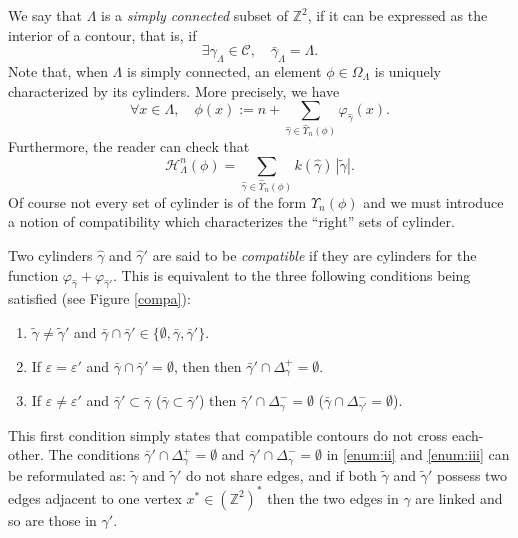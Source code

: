 \documentclass[JEP,XML,SOM,Unicode, NoFloatCountersInSection]{cedram}
\let\mathcal\mathscr
\newenvironment{enumeratei}
{\bgroup\def\theenumi{\roman{enumi}}\def\theenumii{\Alph{enumii}}\begin{enumerate}}
{\end{enumerate}\egroup}
\numberwithin{equation}{section}
\theoremstyle{plain}
\theoremstyle{definition}
\newcommand{\cH}{{\ensuremath{\mathcal H}} }
\newcommand{\cC}{{\ensuremath{\mathcal C}} }
\newcommand{\bbZ}{{\ensuremath{\mathbb Z}} }
\newcommand{\gep}{\varepsilon}
\newcommand{\gO}{\Omega}
\newcommand{\gL}{\Lambda}
\begin{document}
We say that $\gL$ is a \textit{simply connected} subset of $\bbZ^2$, if it can be expressed as the interior of a contour,
that is, if
\begin{equation} \label{connectedness}
\exists \gamma_{\gL}\in \cC, \quad \bar\gamma_{\gL}=\gL.
\end{equation}
Note that, when $\gL$ is simply connected,
an element
$\phi\in \gO_{\gL}$ is uniquely characterized by its cylinders. More precisely, we have
\begin{equation}\label{cylinder}
\forall x\in \gL, \quad \phi(x):= n+\sum_{\hat \gamma \in \hat \Upsilon_n(\phi)} \varphi_{\hat \gamma}(x).
\end{equation}
Furthermore, the reader can check that
\begin{equation}\label{express}
\cH^n_{\gL}(\phi)=\sum_{\hat \gamma \in \hat \Upsilon_n(\phi)} k(\hat \gamma)\,|\tilde \gamma|.
\end{equation}
Of course not every set of cylinder is of the form $\hat \Upsilon_n(\phi)$ and we must introduce a notion of compatibility
which characterizes the ``right'' sets of cylinder.

Two cylinders $\hat \gamma$ and $\hat \gamma'$ are said to be \emph{compatible} if they are
cylinders for the function $\varphi_{\hat \gamma}+\varphi_{\hat \gamma'}$.
This is equivalent to the three following conditions being satisfied
(see Figure \ref{compa}):
\begin{enumeratei}
\item\label{enum:i}
$\tilde \gamma\ne \tilde\gamma'$ and $\bar \gamma \cap \bar \gamma' \in\{\emptyset,\bar \gamma, \bar \gamma'\}$.
\item\label{enum:ii}
If $\gep= \gep'$ and $\bar\gamma\cap \bar \gamma'= \emptyset$, then
then $\bar \gamma'\cap \Delta^+_{\gamma}=\emptyset$.
\item\label{enum:iii}
If $\gep\ne \gep'$ and $\bar \gamma'\subset \bar \gamma$ (\resp $\bar \gamma\subset \bar \gamma'$) then
$\bar \gamma'\cap \Delta^-_{\gamma}=\emptyset$ (\resp $\bar \gamma\cap \Delta^-_{\gamma'}=\emptyset$).
\end{enumeratei}
This first condition simply states that compatible contours do not cross each-other.
The conditions $\bar \gamma'\cap \Delta^+_{\gamma}=\emptyset$ and $\bar \gamma'\cap \Delta^-_{\gamma}=\emptyset$ in \eqref{enum:ii} and \eqref{enum:iii}
can be reformulated as: $\tilde \gamma$ and $\tilde \gamma'$ do not share edges, and if both $\tilde \gamma$ and $\tilde \gamma'$ possess
two edges adjacent to one vertex
$x^*\in (\bbZ^2)^*$
then the two edges in $\gamma$ are linked and so are those in $\gamma'$.
\end{document}
